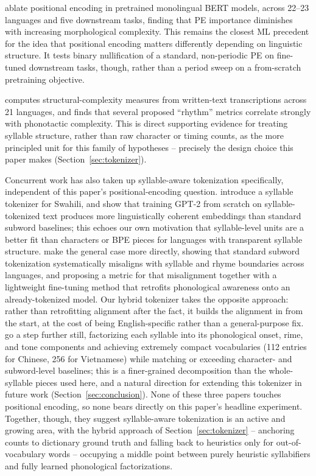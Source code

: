 \documentclass[11pt]{article}
\begin{document}
\citet{ghosh2024morphology} ablate positional encoding in pretrained monolingual BERT models, across 22--23 languages and five downstream tasks, finding that PE importance diminishes with increasing morphological complexity. This remains the closest ML precedent for the idea that positional encoding matters differently depending on linguistic structure. It tests binary nullification of a standard, non-periodic PE on fine-tuned downstream tasks, though, rather than a period sweep on a from-scratch pretraining objective.

\citet{stojanovic2013rhythm} computes structural-complexity measures from written-text transcriptions across 21 languages, and finds that several proposed ``rhythm'' metrics correlate strongly with phonotactic complexity. This is direct supporting evidence for treating syllable structure, rather than raw character or timing counts, as the more principled unit for this family of hypotheses -- precisely the design choice this paper makes (Section~\ref{sec:tokenizer}).

Concurrent work has also taken up syllable-aware tokenization specifically, independent of this paper's positional-encoding question. \citet{atuhurra2024syllable} introduce a syllable tokenizer for Swahili, and show that training GPT-2 from scratch on syllable-tokenized text produces more linguistically coherent embeddings than standard subword baselines; this echoes our own motivation that syllable-level units are a better fit than characters or BPE pieces for languages with transparent syllable structure. \citet{liao2026tokenization} make the general case more directly, showing that standard subword tokenization systematically misaligns with syllable and rhyme boundaries across languages, and proposing a metric for that misalignment together with a lightweight fine-tuning method that retrofits phonological awareness onto an already-tokenized model. Our hybrid tokenizer takes the opposite approach: rather than retrofitting alignment after the fact, it builds the alignment in from the start, at the cost of being English-specific rather than a general-purpose fix. \citet{nguyen2026syllables} go a step further still, factorizing each syllable into its phonological onset, rime, and tone components and achieving extremely compact vocabularies (112 entries for Chinese, 256 for Vietnamese) while matching or exceeding character- and subword-level baselines; this is a finer-grained decomposition than the whole-syllable pieces used here, and a natural direction for extending this tokenizer in future work (Section~\ref{sec:conclusion}). None of these three papers touches positional encoding, so none bears directly on this paper's headline experiment. Together, though, they suggest syllable-aware tokenization is an active and growing area, with the hybrid approach of Section~\ref{sec:tokenizer} -- anchoring counts to dictionary ground truth and falling back to heuristics only for out-of-vocabulary words -- occupying a middle point between purely heuristic syllabifiers and fully learned phonological factorizations.
\end{document}
